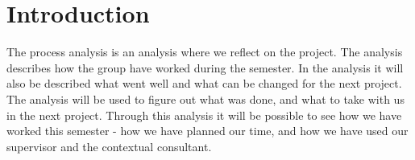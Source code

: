 \chapter{Introduction}
The process analysis is an analysis where we reflect on the project. The analysis describes how the group have worked during the semester. In the analysis it will also be described what went well and what can be changed for the next project. The analysis will be used to figure out what was done, and what to take with us in the next project. Through this analysis it will be possible to see how we have worked this semester - how we have planned our time, and how we have used our supervisor and the contextual consultant. 